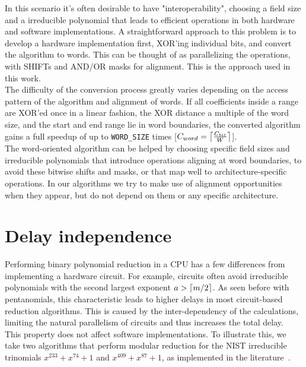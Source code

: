 In this scenario it's often desirable to have "interoperability", choosing a field size and a irreducible polynomial that leads to efficient operations in both hardware and software implementations. A straightforward approach to this problem is to develop a hardware implementation first, XOR'ing individual bits, and convert the algorithm to words. This can be thought of as parallelizing the operations, with SHIFTs and AND/OR masks for alignment. This is the approach used in this work. \\

The difficulty of the conversion process greatly varies depending on the access pattern of the algorithm and alignment of words. If all coefficients inside a range are XOR'ed once in a linear fashion, the XOR distance a multiple of the word size, and the start and end range lie in word boundaries, the converted algorithm gains a full speedup of up to \texttt{WORD\_SIZE} times {[}$C_{word} = \ceil*{\frac{C_{bit}}{W}}${]}. \\

The word-oriented algorithm can be helped by choosing specific field sizes and irreducible polynomials that introduce operations aligning at word boundaries, to avoid these bitwise shifts and masks, or that map well to architecture-specific operations. In our algorithms we try to make use of alignment opportunities when they appear, but do not depend on them or any specific architecture. \\

\section{Delay independence}\label{delay-independence}

Performing binary polynomial reduction in a CPU has a few differences from implementing a hardware circuit. For example, circuits often avoid irreducible polynomials with the second largest exponent $a > \ceil{m/2}$. As seen before with pentanomials, this characteristic leads to higher delays in most circuit-based reduction algorithms. This is caused by the inter-dependency of the calculations, limiting the natural parallelism of circuits and thus increases the total delay. \\

This property does not affect software implementations. To illustrate this, we take two algorithms that perform modular reduction for the NIST irreducible trinomials $x^{233} + x^{74} + 1$ and $x^{409} + x^{87} + 1$, as implemented in the literature~\cite[p. 55]{hankerson2006guide}. \\

